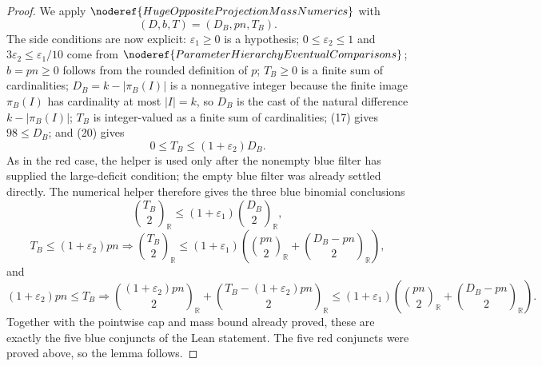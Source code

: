\begin{proof}
We apply \(\noderef{HugeOppositeProjectionMassNumerics}\) with
\[
(D,b,T)=(D_B,pn,T_B).
\]
The side conditions are now explicit: \(\varepsilon_1\ge0\) is a hypothesis;
\(0\le\varepsilon_2\le1\) and
\(3\varepsilon_2\le\varepsilon_1/10\) come from
\(\noderef{ParameterHierarchyEventualComparisons}\); \(b=pn\ge0\) follows
from the rounded definition of \(p\); \(T_B\ge0\) is a finite sum of
cardinalities; \(D_B=k-|\pi_B(I)|\) is a nonnegative integer because
the finite image \(\pi_B(I)\) has cardinality at most \(|I|=k\), so \(D_B\)
is the cast of the natural difference \(k-|\pi_B(I)|\); \(T_B\) is
integer-valued as a finite sum of cardinalities; (17) gives \(98\le D_B\);
and (20) gives
\[
0\le T_B\le(1+\varepsilon_2)D_B.
\]
As in the red case, the helper is used only after the nonempty blue filter
has supplied the large-deficit condition; the empty blue filter was already
settled directly.
The numerical helper therefore gives the three blue binomial conclusions
\[
\binom{T_B}{2}_{\mathbb R}
\le
(1+\varepsilon_1)\binom{D_B}{2}_{\mathbb R},
\]
\[
T_B\le(1+\varepsilon_2)pn\Longrightarrow
\binom{T_B}{2}_{\mathbb R}
\le
(1+\varepsilon_1)\left(
\binom{pn}{2}_{\mathbb R}+\binom{D_B-pn}{2}_{\mathbb R}\right),
\]
and
\[
(1+\varepsilon_2)pn\le T_B\Longrightarrow
\binom{(1+\varepsilon_2)pn}{2}_{\mathbb R}
+\binom{T_B-(1+\varepsilon_2)pn}{2}_{\mathbb R}
\le
(1+\varepsilon_1)\left(
\binom{pn}{2}_{\mathbb R}+\binom{D_B-pn}{2}_{\mathbb R}\right).
\]
Together with the pointwise cap and mass bound already proved, these are
exactly the five blue conjuncts of the Lean statement.  The five red conjuncts
were proved above, so the lemma follows.
\end{proof}
